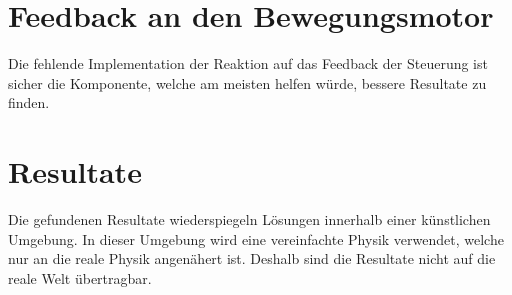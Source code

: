   \section{Feedback an den Bewegungsmotor\label{sec:PerspectiveFeedback}}

    Die fehlende Implementation der Reaktion auf das Feedback der Steuerung ist sicher die Komponente,
    welche am meisten helfen würde, bessere Resultate zu finden.

  \section{Resultate}

    Die gefundenen Resultate wiederspiegeln Lösungen innerhalb einer künstlichen Umgebung.
    In dieser Umgebung wird eine vereinfachte Physik verwendet, welche nur an die reale Physik angenähert ist.
    Deshalb sind die Resultate nicht auf die reale Welt übertragbar.

